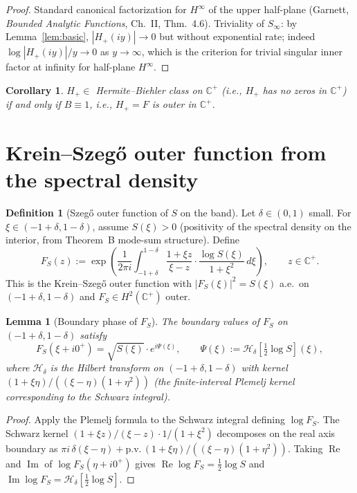 \documentclass[11pt]{article}
\newtheorem{lemma}[theorem]{Lemma}
\newtheorem{corollary}[theorem]{Corollary}
\theoremstyle{definition}
\newtheorem{definition}[theorem]{Definition}
\newcommand{\C}{\mathbb{C}}
\newcommand{\Cpls}{\C^+}
\DeclareMathOperator{\Real}{Re}
\DeclareMathOperator{\Imag}{Im}
\begin{document}
\begin{proof}
Standard canonical factorization for $H^\infty$ of the upper half-plane (Garnett, \emph{Bounded Analytic Functions}, Ch.~II, Thm.~4.6). Triviality of $S_\infty$: by Lemma~\ref{lem:basic}, $|H_+(iy)| \to 0$ but without exponential rate; indeed $\log|H_+(iy)|/y \to 0$ as $y \to \infty$, which is the criterion for trivial singular inner factor at infinity for half-plane $H^\infty$.
\end{proof}

\begin{corollary}\label{cor:outer-iff-BtrivialB}
$H_+ \in$ Hermite--Biehler class on $\Cpls$ (i.e., $H_+$ has no zeros in $\Cpls$) if and only if $B \equiv 1$, i.e., $H_+ = F$ is outer in $\Cpls$.
\end{corollary}

\section{Krein--Szeg\H{o} outer function from the spectral density}

\begin{definition}[Szeg\H{o} outer function of $S$ on the band]
Let $\delta \in (0,1)$ small. For $\xi \in (-1+\delta, 1-\delta)$, assume $S(\xi) > 0$ (positivity of the spectral density on the interior, from Theorem~B mode-sum structure). Define
\[
F_S(z) := \exp\!\left(\frac{1}{2\pi i}\int_{-1+\delta}^{1-\delta}\frac{1 + \xi z}{\xi - z}\cdot\frac{\log S(\xi)}{1 + \xi^2}\,d\xi\right), \qquad z \in \Cpls.
\]
This is the Krein--Szeg\H{o} outer function with $|F_S(\xi)|^2 = S(\xi)$ a.e.\ on $(-1+\delta, 1-\delta)$ and $F_S \in H^2(\Cpls)$ outer.
\end{definition}

\begin{lemma}[Boundary phase of $F_S$]\label{lem:szego-phase}
The boundary values of $F_S$ on $(-1+\delta, 1-\delta)$ satisfy
\[
F_S(\xi + i0^+) = \sqrt{S(\xi)}\cdot e^{i\Psi(\xi)}, \qquad \Psi(\xi) := \mathcal H_\delta\!\left[\tfrac12 \log S\right]\!(\xi),
\]
where $\mathcal H_\delta$ is the Hilbert transform on $(-1+\delta, 1-\delta)$ with kernel $(1 + \xi \eta)/((\xi - \eta)(1 + \eta^2))$ (the finite-interval Plemelj kernel corresponding to the Schwarz integral).
\end{lemma}

\begin{proof}
Apply the Plemelj formula to the Schwarz integral defining $\log F_S$. The Schwarz kernel $(1 + \xi z)/(\xi - z)\cdot 1/(1+\xi^2)$ decomposes on the real axis boundary as $\pi i\,\delta(\xi - \eta) + \text{p.v.}\,(1+\xi\eta)/((\xi-\eta)(1+\eta^2))$. Taking $\Real$ and $\Imag$ of $\log F_S(\eta + i0^+)$ gives $\Real \log F_S = \tfrac12 \log S$ and $\Imag \log F_S = \mathcal H_\delta[\tfrac12 \log S]$.
\end{proof}
\end{document}

